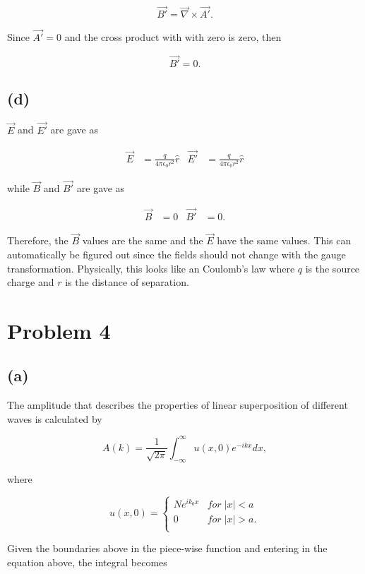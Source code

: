 \documentclass[11pt]{article}
\begin{document}
$$
\Vec{B'} = \Vec{\nabla} \times \vec{A'}.
$$

Since $\vec{A'} = 0$ and the cross product with with zero is zero, then

$$
\vec{B'} = 0.
$$

\subsection*{(d)}

$\vec{E}$ and $\vec{E'}$ are gave as

\begin{align*}
    \Vec{E} &= \frac{q}{4\pi\epsilon_{0}r^{2}}\hat{r} & \Vec{E'} &= \frac{q}{4\pi\epsilon_{0}r^{2}} \hat{r}
\end{align*}

while $\vec{B}$ and $\vec{B'}$ are gave as

\begin{align*}
    \Vec{B} &= 0 & \Vec{B'} &= 0.
\end{align*}

Therefore, the $\vec{B}$ values are the same and the $\vec{E}$ have the same values. This can automatically be figured out since the fields should not change with the gauge transformation. Physically, this looks like an Coulomb's law where $q$ is the source charge and $r$ is the distance of separation. 

\clearpage

\section*{Problem 4}

\subsection*{(a)}

The amplitude that describes the properties of linear superposition of different waves is calculated by

$$
A(k) = \frac{1}{\sqrt{2\pi}} \int_{-\infty}^{\infty} u(x,0)e^{-ikx}dx,
$$

where


\[ u(x,0) = \begin{cases} 
       Ne^{ik_{0}x} & for \; |x| < a \\
      0 & for \; |x| > a. \\
   \end{cases}
\]

Given the boundaries above in the piece-wise function and entering in the equation above, the integral becomes
\end{document}

